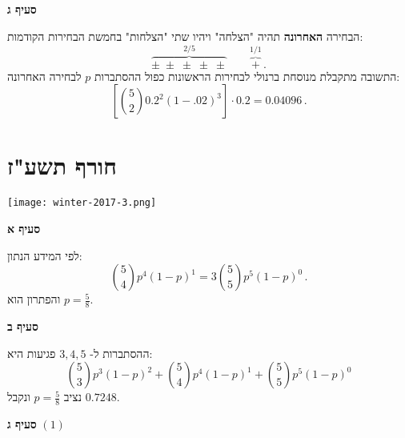 \newpage

\textbf{סעיף ג}

הבחירה 
\textbf{האחרונה} 
תהיה "הצלחה" ויהיו שתי "הצלחות" בחמשת הבחירות הקודמות:
\[
\overbrace{\pm\;\pm\;\pm\;\pm\;\pm}^{2/5}\quad\quad \overbrace{+}^{1/1}\,.
\]
התשובה מתקבלת מנוסחת ברנולי לבחירות הראשונות כפול ההסתברות
$p$
לבחירה האחרונה:
\[
\left[{5\choose 2}0.2^2 (1-.02)^3\right]\cdot 0.2=0.04096\,.
\]

\np
\section{חורף תשע"ז}

\begin{center}
\texttt{[image: winter-2017-3.png]}
\end{center}
\vspace{-1ex}

\textbf{סעיף א}

לפי המידע הנתון:
\[
{5 \choose 4} p^4(1-p)^1 = 3{5\choose 5}p^5(1-p)^0\,.
\]
והפתרון הוא
$p=\frac{5}{8}$.

\textbf{סעיף ב}

ההסתברות ל-%
$3,4,5$
פגיעות היא:
\[
{5 \choose 3}p^3(1-p)^2 + {5 \choose 4}p^4(1-p)^1 + {5 \choose 5}p^5(1-p)^0
\]
נציב
$p=\frac{5}{8}$
ונקבל
$0.7248$.

\textbf{סעיף ג} 
$(1)$

